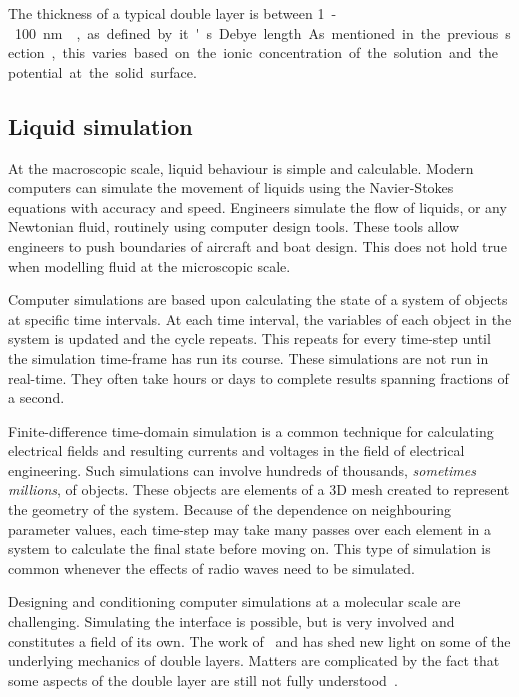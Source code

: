     The thickness of a typical double layer is between \SI{1}-\SI{100}{\nano\meter}~\cite{Jiang2010}, as defined by it's Debye length.
    As mentioned in the previous section, this varies based on the ionic concentration of the solution and the potential at the solid surface.


  \subsection{Liquid simulation}
    \label{sub:molecularSimulation}

    At the macroscopic scale, liquid behaviour is simple and calculable.
    Modern computers can simulate the movement of liquids using the Navier-Stokes equations with accuracy and speed.
    Engineers simulate the flow of liquids, or any Newtonian fluid, routinely using computer design tools.
    These tools allow engineers to push boundaries of aircraft and boat design.
    This does not hold true when modelling fluid at the microscopic scale.

    Computer simulations are based upon calculating the state of a system of objects at specific time intervals.
    At each time interval, the variables of each object in the system is updated and the cycle repeats.
    This repeats for every time-step until the simulation time-frame has run its course.
    These simulations are not run in real-time.
    They often take hours or days to complete results spanning fractions of a second.

    Finite-difference time-domain simulation is a common technique for calculating electrical fields and resulting currents and voltages in the field of electrical engineering.
    Such simulations can involve hundreds of thousands, \emph{sometimes millions}, of objects.
    These objects are elements of a 3D mesh created to represent the geometry of the system.
    Because of the dependence on neighbouring parameter values, each time-step may take many passes over each element in a system to calculate the final state before moving on.
    This type of simulation is common whenever the effects of radio waves need to be simulated.

    Designing and conditioning computer simulations at a molecular scale are challenging.
    Simulating the interface is possible, but is very involved and constitutes a field of its own.
    The work of~\cite{Nagy1992} and \cite{Bazant2011} has shed new light on some of the underlying mechanics of double layers.
    Matters are complicated by the fact that some aspects of the double layer are still not fully understood~\cite{Kornyshev2007}.

